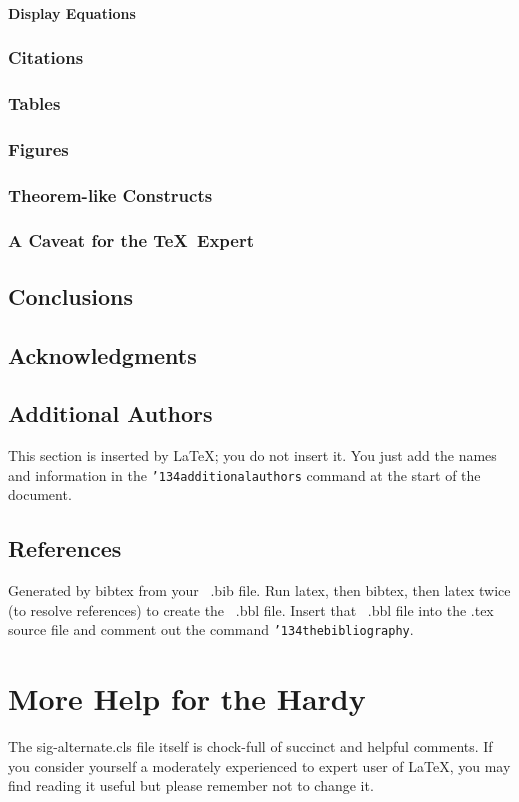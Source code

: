 \documentclass{sig-alternate}
\begin{document}
\paragraph{Display Equations}
\subsubsection{Citations}
\subsubsection{Tables}
\subsubsection{Figures}
\subsubsection{Theorem-like Constructs}
\subsubsection*{A Caveat for the \TeX\ Expert}
\subsection{Conclusions}
\subsection{Acknowledgments}
\subsection{Additional Authors}
This section is inserted by \LaTeX; you do not insert it.
You just add the names and information in the
\texttt{{\char'134}additionalauthors} command at the start
of the document.
\subsection{References}
Generated by bibtex from your ~.bib file.  Run latex,
then bibtex, then latex twice (to resolve references)
to create the \cite{mur} ~.bbl file. \cite{roadalarm} Insert that ~.bbl file into
the .tex source file and comment out
the command \texttt{{\char'134}thebibliography}.
\section{More Help for the Hardy}
The sig-alternate.cls file itself is chock-full of succinct
and helpful comments.  If you consider yourself a moderately
experienced to expert user of \LaTeX, you may find reading
it useful but please remember not to change it.
\end{document}
